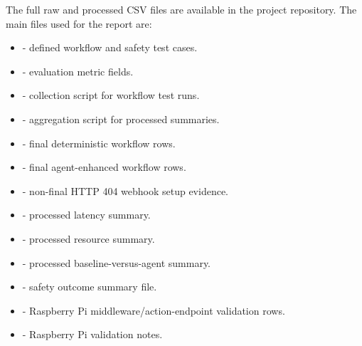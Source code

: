 The full raw and processed CSV files are available in the project repository. The main files used for the report are:

\begin{itemize}
    \item {} - defined workflow and safety test cases.
    \item {} - evaluation metric fields.
    \item {} - collection script for workflow test runs.
    \item {} - aggregation script for processed summaries.
    \item {} - final deterministic workflow rows.
    \item {} - final agent-enhanced workflow rows.
    \item {} - non-final HTTP 404 webhook setup evidence.
    \item {} - processed latency summary.
    \item {} - processed resource summary.
    \item {} - processed baseline-versus-agent summary.
    \item {} - safety outcome summary file.
    \item {} - Raspberry Pi middleware/action-endpoint validation rows.
    \item {} - Raspberry Pi validation notes.
\end{itemize}
